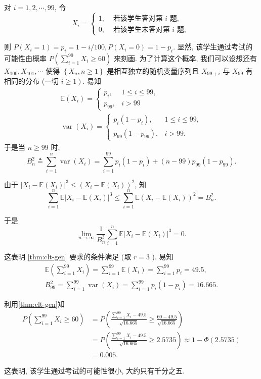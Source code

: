      \begin{solution}
        对 $i=1,2, \cdots, 99$, 令
$$
X_i= \begin{cases}1, & \text { 若该学生答对第 } i \text { 题, } \\ 0, & \text { 若该学生未答对第 } i \text { 题, }\end{cases}
$$

则 $P\left(X_i=1\right)=p_i=1-i / 100, P\left(X_i=0\right)=1-p_i$.
显然, 该学生通过考试的可能性由概率 $P\left(\sum_{i=1}^{99} X_i \geq 60\right)$ 来刻画. 为了计算这个概率, 我们可以设想还有 $X_{100}, X_{101}, \cdots$ 使得 $\left\{X_n, n \geq 1\right\}$ 是相互独立的随机变量序列且 $X_{99+i}$ 与 $X_{99}$ 有相同的分布 (一切 $\left.i \geq 1\right)$. 易知
$$
\begin{gathered}
\mathbb{E}\left(X_i\right)= \begin{cases}p_i, & 1 \leq i \leq 99, \\
p_{99}, & i>99\end{cases} \\
\operatorname{var}\left(X_i\right)= \begin{cases}p_i\left(1-p_i\right), & 1 \leq i \leq 99, \\
p_{99}\left(1-p_{99}\right), & i>99 .\end{cases}
\end{gathered}
$$
于是当 $n \geq 99$ 时,
$$
B_n^2 \triangleq \sum_{i=1}^n \operatorname{var}\left(X_i\right)=\sum_{i=1}^{99} p_i\left(1-p_i\right)+(n-99) p_{99}\left(1-p_{99}\right) .
$$

由于 $\left|X_i-\mathbb{E}\left(X_i\right)\right|^3 \leq\left(X_i-\mathbb{E}\left(X_i\right)\right)^2$, 知
$$
\sum_{i=1}^n \mathbb{E}\left|X_i-\mathbb{E}\left(X_i\right)\right|^3 \leq \sum_{i=1}^n \mathbb{E}\left(X_i-\mathbb{E}\left(X_i\right)\right)^2=B_n^2 .
$$

于是$$
\lim _{n \rightarrow \infty} \frac{1}{B_n^3} \sum_{i=1}^n \mathbb{E}\left|X_i-\mathbb{E}\left(X_i\right)\right|^3=0 .
$$

这表明 \cref{thm:clt-gen} 要求的条件满足 (取 $r=3$ ). 易知
$$
\begin{gathered}
\mathbb{E}\left(\sum_{i=1}^{99} X_i\right)=\sum_{i=1}^{99} \mathbb{E}\left(X_i\right)=\sum_{i=1}^{99} p_i=49.5, \\
B_{99}^2=\sum_{i=1}^{99} \operatorname{var}\left(X_i\right)=\sum_{i=1}^{99} p_i\left(1-p_i\right)=16.665 .
\end{gathered}
$$

利用\cref{thm:clt-gen}知
$$
\begin{aligned}
P\left(\sum_{i=1}^{99} X_i \geq 60\right)&=P\left(\frac{\sum_{i=1}^{99} X_i-49.5}{\sqrt{16.665}} \geq \frac{60-49.5}{\sqrt{16.665}}\right)  \\
& =P\left(\frac{\sum_{i=1}^{99} X_i-49.5}{\sqrt{16.665}} \geq 2.5735\right) \approx 1-\Phi(2.5735) \\
& =0.005 .
\end{aligned}
$$

这表明, 该学生通过考试的可能性很小, 大约只有千分之五.
     \end{solution}